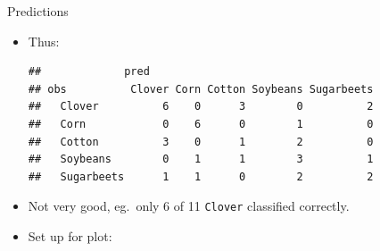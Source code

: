 \begin{frame}[fragile]{Predictions}
  
  \begin{itemize}
  \item Thus:
\begin{knitrout}
\color{fgcolor}\begin{kframe}
\begin{alltt}
\hlkwb{=}
\hlstd{(}\hlopt{$}\hlopt{$}
\end{alltt}
\begin{verbatim}
##             pred
## obs          Clover Corn Cotton Soybeans Sugarbeets
##   Clover          6    0      3        0          2
##   Corn            0    6      0        1          0
##   Cotton          3    0      1        2          0
##   Soybeans        0    1      1        3          1
##   Sugarbeets      1    1      0        2          2
\end{verbatim}
\end{kframe}
\end{knitrout}
\item Not very good, eg.\ only 6 of 11 \texttt{Clover} classified correctly.
\item Set up for plot:
  
\begin{knitrout}
\color{fgcolor}\begin{kframe}
\begin{alltt}
\hlkwb{=}\hlstd{(}\hlopt{$}\hlopt{$}
\end{alltt}
\end{kframe}
\end{knitrout}
    
  \end{itemize}

  
\end{frame}


